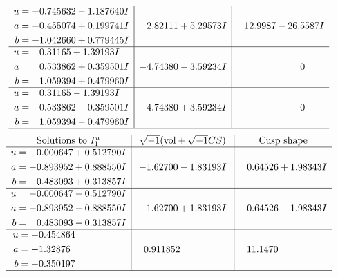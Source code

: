 \documentclass[1p]{elsarticle_modified}
\theoremstyle{definition}
\newcommand{\I}{\sqrt{-1}}
\begin{document}
$$\begin{array}{c|c|c}
\begin{aligned}
u &= -0.745632 - 1.187640 I \\
a &= -0.455074 + 0.199741 I \\
b &= -1.042660 + 0.779445 I\end{aligned}
 & \phantom{-}2.82111 + 5.29573 I & \phantom{-}12.9987 - 26.5587 I \\ \hline\begin{aligned}
u &= \phantom{-}0.31165 + 1.39193 I \\
a &= \phantom{-}0.533862 + 0.359501 I \\
b &= \phantom{-}1.059394 + 0.479960 I\end{aligned}
 & -4.74380 - 3.59234 I & \phantom{-0.000000 } 0 \\ \hline\begin{aligned}
u &= \phantom{-}0.31165 - 1.39193 I \\
a &= \phantom{-}0.533862 - 0.359501 I \\
b &= \phantom{-}1.059394 - 0.479960 I\end{aligned}
 & -4.74380 + 3.59234 I & \phantom{-0.000000 } 0\\
 \hline 
 \end{array}$$\newpage$$\begin{array}{c|c|c}  
\text{Solutions to }I^u_{1}& \I (\text{vol} + \sqrt{-1}CS) & \text{Cusp shape}\\
 \hline 
\begin{aligned}
u &= -0.000647 + 0.512790 I \\
a &= -0.893952 + 0.888550 I \\
b &= \phantom{-}0.483093 + 0.313857 I\end{aligned}
 & -1.62700 - 1.83193 I & \phantom{-}0.64526 + 1.98343 I \\ \hline\begin{aligned}
u &= -0.000647 - 0.512790 I \\
a &= -0.893952 - 0.888550 I \\
b &= \phantom{-}0.483093 - 0.313857 I\end{aligned}
 & -1.62700 + 1.83193 I & \phantom{-}0.64526 - 1.98343 I \\ \hline\begin{aligned}
u &= -0.454864\phantom{ +0.000000I} \\
a &= -1.32876\phantom{ +0.000000I} \\
b &= -0.350197\phantom{ +0.000000I}\end{aligned}
 & \phantom{-}0.911852\phantom{ +0.000000I} & \phantom{-}11.1470\phantom{ +0.000000I}\\
 \hline 
 \end{array}$$\newpage\newpage\renewcommand{\arraystretch}{1}
\end{document}
